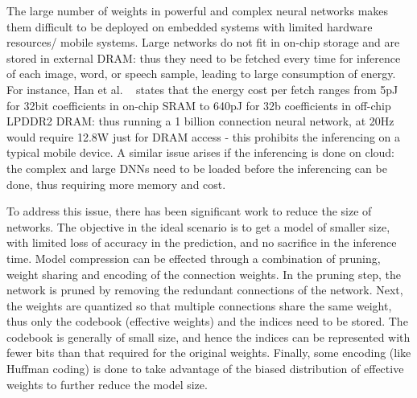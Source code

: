 The large number of weights in powerful and complex neural networks makes them difficult to be deployed on embedded systems 
with limited hardware resources/ mobile systems. 
Large networks do not fit in on-chip storage  and are stored in external DRAM: thus they 
need to be  fetched every time for inference of each image, word, or speech sample, leading to 
large consumption of energy. For instance,  Han et al. ~\cite{HanMD15}
states that the energy cost per  fetch ranges from 5pJ for 32bit coefficients in on-chip SRAM to 640pJ for 32b coefficients in off-chip
LPDDR2 DRAM:  thus running a 1 billion connection neural network,  at 20Hz would require  12.8W just for DRAM access - 
this prohibits the inferencing on a  typical mobile device.
A similar issue arises if the inferencing is done on cloud: the complex and large DNNs need to be loaded before the inferencing can be done, thus requiring more
memory and cost.

To address this issue, there has been significant work to reduce the size of networks.  
The objective in the ideal scenario is to get a model of smaller size, with limited loss of accuracy in the prediction, and no sacrifice in the inference time.
Model compression can be  effected  through a combination of pruning, weight sharing and encoding of the connection weights.
In the pruning step,  the network is pruned  by removing the redundant connections of the network.
Next, the weights are quantized so that multiple connections share the same weight, thus only the codebook (effective weights) and the indices need to be stored. 
The codebook is generally of small size, and hence the indices can be represented with fewer bits than that required for the original weights.
Finally, some encoding (like Huffman coding) is done to take advantage of the biased distribution of effective weights to further reduce the model size.


